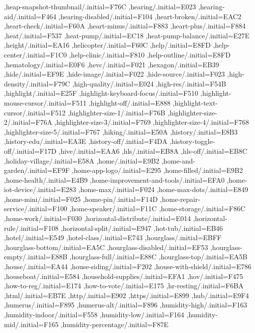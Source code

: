 { ,heap-snapshot-thumbnail/.initial=F76C
 ,hearing/.initial=E023
 ,hearing-aid/.initial=F464
 ,hearing-disabled/.initial=F104
 ,heart-broken/.initial=EAC2
 ,heart-check/.initial=F60A
 ,heart-minus/.initial=F883
 ,heart-plus/.initial=F884
 ,heat/.initial=F537
 ,heat-pump/.initial=EC18
 ,heat-pump-balance/.initial=E27E
 ,height/.initial=EA16
 ,helicopter/.initial=F60C
 ,help/.initial=E8FD
 ,help-center/.initial=F1C0
 ,help-clinic/.initial=F810
 ,help-outline/.initial=E8FD
 ,hematology/.initial=E0F6
 ,hevc/.initial=F021
 ,hexagon/.initial=EB39
 ,hide/.initial=EF9E
 ,hide-image/.initial=F022
 ,hide-source/.initial=F023
 ,high-density/.initial=F79C
 ,high-quality/.initial=E024
 ,high-res/.initial=F54B
 ,highlight/.initial=E25F
 ,highlight-keyboard-focus/.initial=F510
 ,highlight-mouse-cursor/.initial=F511
 ,highlight-off/.initial=E888
 ,highlight-text-cursor/.initial=F512
 ,highlighter-size-1/.initial=F76B
 ,highlighter-size-2/.initial=F76A
 ,highlighter-size-3/.initial=F769
 ,highlighter-size-4/.initial=F768
 ,highlighter-size-5/.initial=F767
 ,hiking/.initial=E50A
 ,history/.initial=E8B3
 ,history-edu/.initial=EA3E
 ,history-off/.initial=F4DA
 ,history-toggle-off/.initial=F17D
 ,hive/.initial=EAA6
 ,hls/.initial=EB8A
 ,hls-off/.initial=EB8C
 ,holiday-village/.initial=E58A
 ,home/.initial=E9B2
 ,home-and-garden/.initial=EF9F
 ,home-app-logo/.initial=E295
 ,home-filled/.initial=E9B2
 ,home-health/.initial=E4B9
 ,home-improvement-and-tools/.initial=EFA0
 ,home-iot-device/.initial=E283
 ,home-max/.initial=F024
 ,home-max-dots/.initial=E849
 ,home-mini/.initial=F025
 ,home-pin/.initial=F14D
 ,home-repair-service/.initial=F100
 ,home-speaker/.initial=F11C
 ,home-storage/.initial=F86C
 ,home-work/.initial=F030
 ,horizontal-distribute/.initial=E014
 ,horizontal-rule/.initial=F108
 ,horizontal-split/.initial=E947
 ,hot-tub/.initial=EB46
 ,hotel/.initial=E549
 ,hotel-class/.initial=E743
 ,hourglass/.initial=EBFF
 ,hourglass-bottom/.initial=EA5C
 ,hourglass-disabled/.initial=EF53
 ,hourglass-empty/.initial=E88B
 ,hourglass-full/.initial=E88C
 ,hourglass-top/.initial=EA5B
 ,house/.initial=EA44
 ,house-siding/.initial=F202
 ,house-with-shield/.initial=E786
 ,houseboat/.initial=E584
 ,household-supplies/.initial=EFA1
 ,hov/.initial=F475
 ,how-to-reg/.initial=E174
 ,how-to-vote/.initial=E175
 ,hr-resting/.initial=F6BA
 ,html/.initial=EB7E
 ,http/.initial=E902
 ,https/.initial=E899
 ,hub/.initial=E9F4
 ,humerus/.initial=F895
 ,humerus-alt/.initial=F896
 ,humidity-high/.initial=F163
 ,humidity-indoor/.initial=F558
 ,humidity-low/.initial=F164
 ,humidity-mid/.initial=F165
 ,humidity-percentage/.initial=F87E
}
